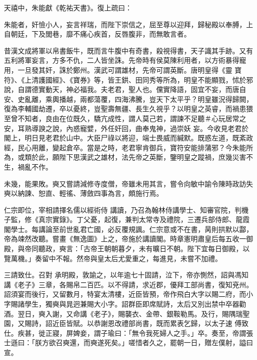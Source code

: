 \begin{pinyinscope}
 天禧中，朱能獻《乾祐天書》。復上疏曰：



 朱能者，奸憸小人，妄言祥瑞，而陛下崇信之，屈至尊以迎拜，歸秘殿以奉膊，上自朝廷，下及閭巷，靡不痛心疾首，反唇腹非，而無敢言者。



 昔漢文成將軍以帛書飯牛，既而言牛腹中有奇書，殺視得書，天子識其手跡。又有五利將軍妄言，方多不仇，二人皆坐誅。先帝時有侯莫陳利用者，以方術暴得寵用，一旦發其奸，誅於鄭州。漢武可謂雄材，先帝可謂英斷。唐明皇得《靈
 寶符》、《上清護國經》、《寶券》等，皆王鉷、田同秀等所為，明皇不能顯戮，怵於邪說，自謂德實動天，神必福我。夫老君，聖人也。儻實降語，固宜不妄，而唐自安、史亂離，乘輿播越，兩都蕩覆，四海沸騰，豈天下太平乎？明皇雖況得歸闕，復為李輔國劫遷，卒以憂終，豈聖壽無疆、長生久視乎？以明皇之英睿，而禍患猥至曾不知者，良由在位既久，驕亢成性，謂人莫己若，謂諫不足聽＃心玩居常之安，耳熟導諛之說，內惑寵嬖，外任奸回，曲奉鬼神，過崇妖
 妄。今收見老君於閣上，明日見老君於山中。大臣尸祿以將迎，端士畏威而緘默。既惑左道，既紊政經，民心用離，變起倉卒。當是之時，老君寧肯御兵，寶符安能排蒲邪？今朱能所為，或類於此，願陛下思漢武之雄材，法先帝之英斷，鑒明皇之蹤禍，庶幾災害不生，禍亂不作。



 未幾，能果敗。奭又嘗請減修寺度僧，帝雖未用其言，嘗令向敏中諭令陳時政訪失奭以納諫、恕直、輕徭、薄斂四事為言，頗施行焉。



 仁宗即位，宰相請擇名儒以經術侍
 講讀，乃召為翰林侍講學士、知審官院，判機子監，修《真宗實錄》。丁父憂，起復，兼判太常寺及禮院，三遷兵部侍郎、龍霞閣學士。每講論至前世亂君亡國，必反覆規諷。仁宗意或不在書，昺則拱默以酃，帝為竦然改聽。嘗畫《無逸圖》上之，帝施於講讀閣。時章憲明肅皇后每五收一御殿，與帝同聽政，奭言：「古帝王朝朝暮夕，未有曠日不朝。陛下宜每日御殿，以覽萬機。」奏留中不報。然帝與皇太后尤愛重之，每進見，未嘗不加禮。



 三請致仕。召對
 承明殿，敦諭之，以年逾七十固請，泣下，帝亦惻然，詔與馮知講《老子》三章，各賜帛二百匹。以不得請，求近郡，優拜工部尚書，復知兗州。詔須宴而後行，又留數月，特宴太清樓，近臣皆預，帝作飛白大字以賜二府，而小字賜諸學生，獨奭與晁迥兼賜大小字。詔群臣即席賦詩，太后又別出禁中卒器勸酒。翌日，奭入謝，又命講《老子》，賜襲衣、金帶、銀鞍勒馬。及行，賜隅瑞聖園，又賜詩，詔近臣皆賦。以恭謝恩改禮部尚書，既而累表乞歸，以太子速
 傅致仕。疾甚，徙正寢，屏婢妾，謂子瑜曰：「無令我死婦人之手。」卒。奏至，帝謂張士遜曰：「朕方欲召奭還，而奭遂死矣。」嗟惜者久之，罷朝一日，贈左僕射，謚曰宣。




\end{pinyinscope}
